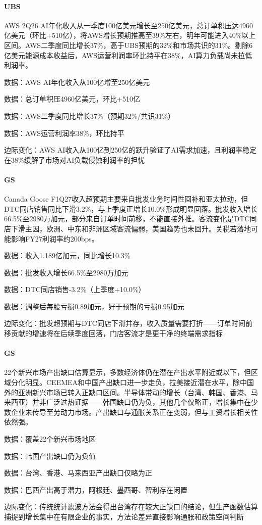 \documentclass[11pt]{ctexart}
\begin{document}
\paragraph{UBS} AWS 2Q26 AI年化收入从一季度100亿美元增长至250亿美元，总订单积压达4960亿美元（环比+510亿），将AWS增长预期推高至39\%左右，明年可能进入40\%以上区间。AWS二季度同比增长37\%，高于UBS预期的32\%和市场共识的31\%。剔除6亿美元能源成本收益后，AWS运营利润率环比持平在38\%，AI算力负载尚未拉低利润率。
{\small\color{refgray}数据：AWS AI年化收入从100亿增至250亿美元\par}
{\small\color{refgray}数据：总订单积压4960亿美元，环比+510亿\par}
{\small\color{refgray}数据：AWS二季度同比增长37\%（预期32\%/共识31\%）\par}
{\small\color{refgray}数据：AWS运营利润率38\%，环比持平\par}
{\small\color{refgray}边际变化：AWS AI收入从100亿到250亿的跃升验证了AI需求加速，且利润率稳定在38\%缓解了市场对AI负载侵蚀利润率的担忧\par}
\paragraph{GS} Canada Goose F1Q27收入超预期主要来自批发业务时间性回补和亚太拉动，但DTC同店销售同比下滑3.2\%，与上季度正增长10.0\%形成明显回落。批发收入增长66.5\%至2980万加元，部分来自订单时间前移，不能直接外推。客流变化是DTC同店下滑主因，欧洲、中东和非洲区域客流偏弱，美国趋势也未回升。关税若落地可能影响FY27利润率约200bps。
{\small\color{refgray}数据：收入1.189亿加元，同比增长10.3\%\par}
{\small\color{refgray}数据：批发收入增长66.5\%至2980万加元\par}
{\small\color{refgray}数据：DTC同店销售-3.2\%（上季度+10.0\%）\par}
{\small\color{refgray}数据：调整后每股亏损0.89加元，好于预期的亏损0.95加元\par}
{\small\color{refgray}边际变化：批发超预期与DTC同店下滑并存，收入质量需要打折——订单时间前移贡献的增速将在后续季度回落，门店客流才是更干净的终端需求指标\par}
\paragraph{GS} 22个新兴市场产出缺口估算显示，多数经济体仍在潜在产出水平附近或以下，但区域分化明显。CEEMEA和中国产出缺口进一步走负，拉美接近潜在水平，除中国外的亚洲新兴市场已转入正缺口区间。半导体带动的增长（台湾、韩国、香港、马来西亚）并非广泛过热证据——韩国缺口仍为负，其他几个仅略正，增长集中在少数企业未传导至劳动力市场。产出缺口与通胀关系正在变弱，但与工资增长相关性依然强。
{\small\color{refgray}数据：覆盖22个新兴市场地区\par}
{\small\color{refgray}数据：韩国产出缺口仍为负值\par}
{\small\color{refgray}数据：台湾、香港、马来西亚产出缺口仅略为正\par}
{\small\color{refgray}数据：巴西产出高于潜力，阿根廷、墨西哥、智利存在闲置\par}
{\small\color{refgray}边际变化：传统统计滤波方法会得出台湾存在较大正缺口的结论，但生产函数估算捕捉到增长集中在有限企业的事实，方法论差异直接影响通胀和政策空间判断\par}
\end{document}
